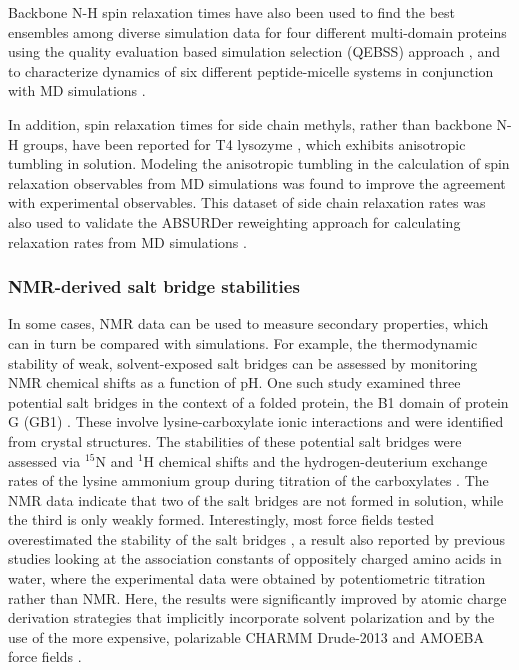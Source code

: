 \documentclass[9pt,review,pubversion]{livecoms}
\begin{document}
Backbone N-H spin relaxation times have also been used to find the best ensembles among diverse simulation data for four different multi-domain proteins using the quality evaluation based simulation selection (QEBSS) approach \cite{sandelin_qebss_2024}, and to characterize dynamics of six different peptide-micelle systems in conjunction with MD simulations \cite{nencini_probing_2024}.

In addition, spin relaxation times for side chain methyls, rather than backbone N-H groups, have been reported for T4 lysozyme \cite{hoffmann_narrowing_2018}, which exhibits anisotropic tumbling in solution.
Modeling the anisotropic tumbling in the calculation of spin relaxation observables from MD simulations was found to improve the agreement with experimental observables.
This dataset of side chain relaxation rates was also used to validate the ABSURDer reweighting approach for calculating relaxation rates from MD simulations \cite{kummerer_fitting_2021}.

\subsubsection{NMR-derived salt bridge stabilities}
\label{sub2:salt_bridge}

In some cases, NMR data can be used to measure secondary properties, which can in turn be compared with simulations.
For example, the thermodynamic stability of weak, solvent-exposed salt bridges can be assessed by monitoring NMR chemical shifts as a function of pH.
One such study examined three potential salt bridges in the context of a folded protein, the B1 domain of protein G (GB1) \cite{ahmed_how_2018}.
These involve lysine-carboxylate ionic interactions and were identified from crystal structures.
The stabilities of these potential salt bridges were assessed via $^{15}$N and $^1$H chemical shifts and the hydrogen-deuterium exchange rates of the lysine ammonium group during titration of the carboxylates \cite{tomlinson2009characterization}.
The NMR data indicate that two of the salt bridges are not formed in solution, while the third is only weakly formed.
Interestingly, most force fields tested overestimated the stability of the salt bridges \cite{ahmed_how_2018}, a result also reported by previous studies \cite{piana_how_2011,debiec_evaluating_2014} looking at the association constants of oppositely charged amino acids in water, where the experimental data were obtained by potentiometric titration rather than NMR.
Here, the results were significantly improved by atomic charge derivation strategies that implicitly incorporate solvent polarization \cite{debiec_further_2016} and by the use of the more expensive, polarizable CHARMM Drude-2013 \cite{lopes_polarizable_2013} and AMOEBA force fields \cite{shi_polarizable_2013}.
\end{document}
